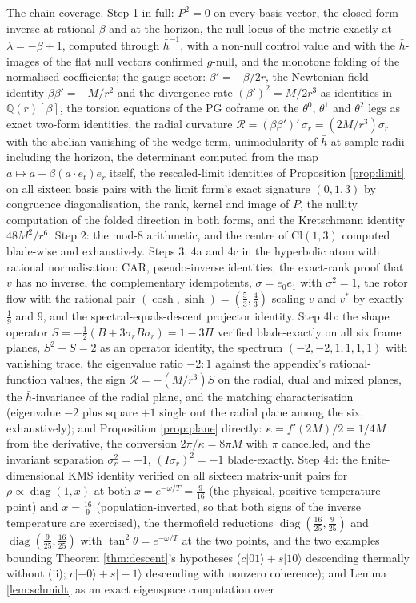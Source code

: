 \documentclass[11pt]{article}
\theoremstyle{definition}
\newcommand{\Cl}{\mathrm{Cl}}
\newcommand{\hb}{\bar{h}}
\begin{document}
The chain coverage. Step 1 in full: $P^2 = 0$ on every basis vector, the closed-form inverse at rational $\beta$ and at the horizon, the null locus of the metric exactly at $\lambda = -\beta \pm 1$, computed through $\hb^{-1}$, with a non-null control value and with the $\hb$-images of the flat null vectors confirmed $g$-null, and the monotone folding of the normalised coefficients; the gauge sector: $\beta' = -\beta/2r$, the Newtonian-field identity $\beta\beta' = -M/r^2$ and the divergence rate $(\beta')^2 = M/2r^3$ as identities in $\mathbb{Q}(r)[\beta]$, the torsion equations of the PG coframe on the $\theta^0$, $\theta^1$ and $\theta^2$ legs as exact two-form identities, the radial curvature $\mathcal{R} = (\beta\beta')'\,\sigma_r = (2M/r^3)\sigma_r$ with the abelian vanishing of the wedge term, unimodularity of $\hb$ at sample radii including the horizon, the determinant computed from the map $a \mapsto a - \beta(a \cdot e_t)e_r$ itself, the rescaled-limit identities of Proposition \ref{prop:limit} on all sixteen basis pairs with the limit form's exact signature $(0,1,3)$ by congruence diagonalisation, the rank, kernel and image of $P$, the nullity computation of the folded direction in both forms, and the Kretschmann identity $48M^2/r^6$. Step 2: the mod-8 arithmetic, and the centre of $\Cl(1,3)$ computed blade-wise and exhaustively. Steps 3, 4a and 4c in the hyperbolic atom with rational normalisation: CAR, pseudo-inverse identities, the exact-rank proof that $v$ has no inverse, the complementary idempotents, $\sigma = e_0 e_1$ with $\sigma^2 = 1$, the rotor flow with the rational pair $(\cosh, \sinh) = (\tfrac53, \tfrac43)$ scaling $v$ and $v^*$ by exactly $\tfrac19$ and $9$, and the spectral-equals-descent projector identity. Step 4b: the shape operator $S = -\tfrac12(B + 3\sigma_r B\sigma_r) = 1 - 3\Pi$ verified blade-exactly on all six frame planes, $S^2 + S = 2$ as an operator identity, the spectrum $(-2,-2,1,1,1,1)$ with vanishing trace, the eigenvalue ratio $-2 : 1$ against the appendix's rational-function values, the sign $\mathcal{R} = -(M/r^{3})S$ on the radial, dual and mixed planes, the $\hb$-invariance of the radial plane, and the matching characterisation (eigenvalue $-2$ plus square $+1$ single out the radial plane among the six, exhaustively); and Proposition \ref{prop:plane} directly: $\kappa = f'(2M)/2 = 1/4M$ from the derivative, the conversion $2\pi/\kappa = 8\pi M$ with $\pi$ cancelled, and the invariant separation $\sigma_r^{2} = +1$, $(I\sigma_r)^{2} = -1$ blade-exactly. Step 4d: the finite-dimensional KMS identity verified on all sixteen matrix-unit pairs for $\rho \propto \operatorname{diag}(1, x)$ at both $x = e^{-\omega/T} = \tfrac{9}{16}$ (the physical, positive-temperature point) and $x = \tfrac{16}{9}$ (population-inverted, so that both signs of the inverse temperature are exercised), the thermofield reductions $\operatorname{diag}(\tfrac{16}{25}, \tfrac{9}{25})$ and $\operatorname{diag}(\tfrac{9}{25}, \tfrac{16}{25})$ with $\tan^2\theta = e^{-\omega/T}$ at the two points, and the two examples bounding Theorem \ref{thm:descent}'s hypotheses ($c|01\rangle + s|10\rangle$ descending thermally without (ii); $c|{+}0\rangle + s|{-}1\rangle$ descending with nonzero coherence); and Lemma \ref{lem:schmidt} as an exact eigenspace computation over 
\end{document}
